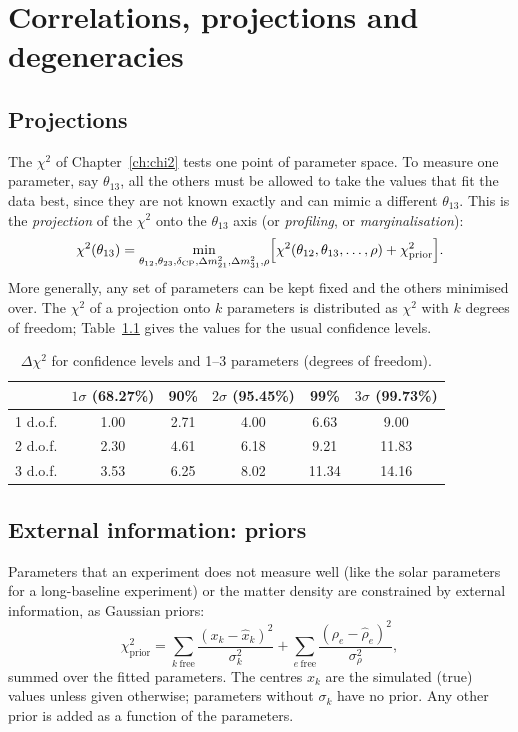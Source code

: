 \chapter{Correlations, projections and degeneracies}\label{ch:fits}

\section{Projections}

The $\chi^2$ of Chapter~\ref{ch:chi2} tests one point of parameter space. To
measure one parameter, say $\theta_{13}$, all the others must be allowed to
take the values that fit the data best, since they are not known exactly and
can mimic a different $\theta_{13}$. This is the \emph{projection} of the
$\chi^2$ onto the $\theta_{13}$ axis (or \emph{profiling}, or
\emph{marginalisation}):
\begin{equation}
\chi^2(\theta_{13}) = \min_{\theta_{12},\theta_{23},\delta_\mathrm{CP},\Delta m^2_{21},\Delta m^2_{31},\rho}
  \Bigl[\chi^2(\theta_{12},\theta_{13},\dots,\rho) + \chi^2_\text{prior}\Bigr].
\label{eq:projection}
\end{equation}
More generally, any set of parameters can be kept fixed and the others
minimised over. The $\chi^2$ of a projection onto $k$ parameters is
distributed as $\chi^2$ with $k$ degrees of freedom; Table~\ref{tab:cl} gives
the values for the usual confidence levels.

\begin{table}[t]
\centering\small
\begin{tabular}{lccccc}
\toprule
& $1\sigma$ (68.27\%) & 90\% & $2\sigma$ (95.45\%) & 99\% & $3\sigma$ (99.73\%) \\
\midrule
1 d.o.f. & 1.00 & 2.71 & 4.00 & 6.63 & 9.00 \\
2 d.o.f. & 2.30 & 4.61 & 6.18 & 9.21 & 11.83 \\
3 d.o.f. & 3.53 & 6.25 & 8.02 & 11.34 & 14.16 \\
\bottomrule
\end{tabular}
\caption{$\Delta\chi^2$ for confidence levels and 1--3 parameters (degrees of
freedom).}
\label{tab:cl}
\end{table}

\section{External information: priors}\label{sec:priors}

Parameters that an experiment does not measure well (like the solar
parameters for a long-baseline experiment) or the matter density are
constrained by external information, as Gaussian priors:
\begin{equation}
\chi^2_\text{prior} = \sum_{k\ \text{free}}\frac{(x_k-\hat x_k)^2}{\sigma_k^2}
  + \sum_{e\ \text{free}}\frac{(\rho_e-\hat\rho_e)^2}{\sigma_\rho^2},
\label{eq:prior}
\end{equation}
summed over the fitted parameters. The centres $\hat x_k$ are the simulated
(true) values unless given otherwise; parameters without $\sigma_k$ have no
prior. Any other prior is added as a function of the parameters.

